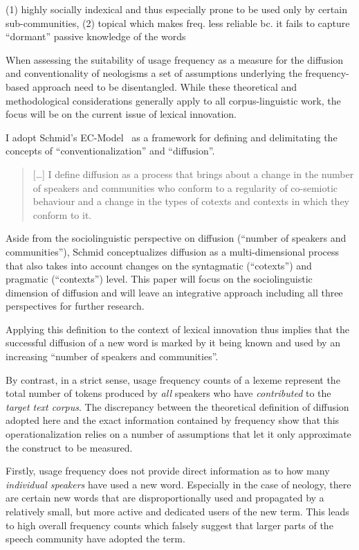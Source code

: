 \documentclass[draft, a4paper, abstract=on]{scrartcl}
\begin{document}
(1) highly socially indexical and thus especially prone to be used only by certain sub-communities,
(2) topical which makes freq. less reliable bc. it fails to capture \enquote{dormant} passive knowledge of the words

When assessing the suitability of usage frequency as a measure for the diffusion and conventionality of neologisms a set of assumptions underlying the frequency-based approach need to be disentangled. While these theoretical and methodological considerations generally apply to all corpus-linguistic work, the focus will be on the current issue of lexical innovation.

I adopt Schmid's EC-Model~\parencite{Schmid2020DynamicsLinguistic} as a framework for defining and delimitating the concepts of \enquote{conventionalization} and \enquote{diffusion}.

\begin{quote}
[\dots] I define diffusion as a process that brings about a change in the number of speakers and communities who conform to a regularity of co-semiotic behaviour and a change in the types of cotexts and contexts in which they conform to it.
\end{quote}

Aside from the sociolinguistic perspective on diffusion (\enquote{number of speakers and communities}), Schmid conceptualizes diffusion as a multi-dimensional process that also takes into account changes on the syntagmatic (\enquote{cotexts}) and pragmatic (\enquote{contexts}) level. This paper will focus on the sociolinguistic dimension of diffusion and will leave an integrative approach including all three perspectives for further research.

Applying this definition to the context of lexical innovation thus implies that the successful diffusion of a new word is marked by it being known and used by an increasing \enquote{number of speakers and communities}.

By contrast, in a strict sense, usage frequency counts of a lexeme represent the total number of tokens produced by \emph{all} speakers who have \emph{contributed} to the \emph{target text corpus}. The discrepancy between the theoretical definition of diffusion adopted here and the exact information contained by frequency show that this operationalization relies on a number of assumptions that let it only approximate the construct to be measured.

Firstly, usage frequency does not provide direct information as to how many \emph{individual speakers} have used a new word. Especially in the case of neology, there are certain new words that are disproportionally used and propagated by a relatively small, but more active and dedicated users of the new term. This leads to high overall frequency counts which falsely suggest that larger parts of the speech community have adopted the term.
\end{document}
